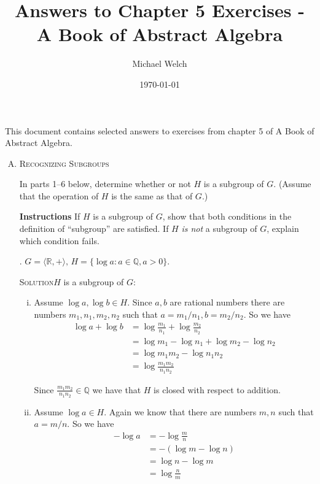 \documentclass[twoside]{amsart}
\newcommand{\solution}{\textsc{Solution}\xspace}
\begin{document}
\title{Answers to Chapter 5 Exercises - A Book of Abstract Algebra}
\author{Michael Welch}
\date{\today}
\maketitle

This document contains selected answers to exercises from chapter 5
of A Book of Abstract Algebra.


\begin{enumerate}[A.]
   \item \textsc{Recognizing Subgroups}

   \noindent In parts 1--6 below, determine whether or not $H$ is a
   subgroup of $G$. (Assume that the operation of $H$ is the same as
   that of $G$.)

   \textbf{Instructions} If $H$ is a subgroup of $G$, show that
   both conditions in the definition of ``subgroup'' are satisfied.
   If $H$ \emph{is not} a subgroup of $G$, explain which condition
   fails.
  

   . $G = \langle \mathbb{R},+ \rangle,\, H = 
   \{\log a : a \in \mathbb{Q}, a > 0 \}$.

   \noindent \solution $H$ is a subgroup of $G$:
   \begin{enumerate}[(i)]
      \item Assume $\log a, \log b \in H$. Since $a,b$ are rational numbers
      there are numbers $m_1,n_1,m_2,n_2$ such that $a = m_1/n_1, b = m_2/n_2$.
      So we have 
      \begin{align*}
         \log a + \log b & = \log \frac{m_1}{n_1} + \log \frac{m_2}{n_2} \\
	                 & = \log m_1 - \log n_1 + \log m_2 - \log n_2 \\
			 & = \log m_1m_2 - \log n_1n_2 \\
			 & = \log \frac{m_1m_2}{n_1n_2}
      \end{align*}

      Since $\displaystyle \frac{m_1m_2}{n_1n_2} \in \mathbb{Q}$ 
      we have that $H$ is closed with respect to addition.

      \item Assume $\log a \in H$. Again we know that there are numbers
      $m,n$ such that $a = m/n$. So we have
      \begin{align*}
         - \log a & = - \log \frac{m}{n} \\
	          & = - (\log m - \log n) \\
		  & = \log n - \log m \\
		  & = \log \frac{n}{m}
      \end{align*}


\end{enumerate}
\end{enumerate}
\end{document}
